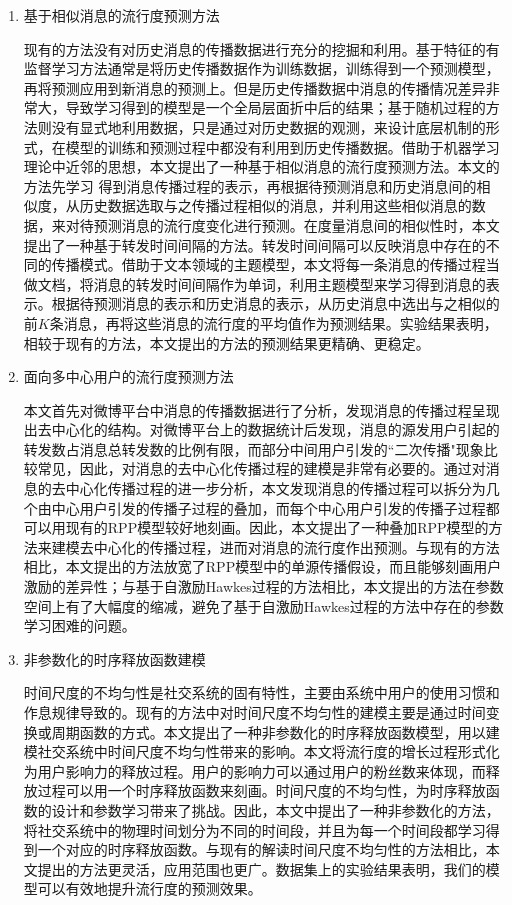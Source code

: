\begin{enumerate}
\item 基于相似消息的流行度预测方法

现有的方法没有对历史消息的传播数据进行充分的挖掘和利用。基于特征的有监督学习方法通常是将历史传播数据作为训练数据，训练得到一个预测模型，再将预测应用到新消息的预测上。但是历史传播数据中消息的传播情况差异非常大，导致学习得到的模型是一个全局层面折中后的结果；基于随机过程的方法则没有显式地利用数据，只是通过对历史数据的观测，来设计底层机制的形式，在模型的训练和预测过程中都没有利用到历史传播数据。借助于机器学习理论中近邻的思想，本文提出了一种基于相似消息的流行度预测方法。本文的方法先学习 得到消息传播过程的表示，再根据待预测消息和历史消息间的相似度，从历史数据选取与之传播过程相似的消息，并利用这些相似消息的数据，来对待预测消息的流行度变化进行预测。在度量消息间的相似性时，本文提出了一种基于转发时间间隔的方法。转发时间间隔可以反映消息中存在的不同的传播模式。借助于文本领域的主题模型，本文将每一条消息的传播过程当做文档，将消息的转发时间间隔作为单词，利用主题模型来学习得到消息的表示。根据待预测消息的表示和历史消息的表示，从历史消息中选出与之相似的前$K$条消息，再将这些消息的流行度的平均值作为预测结果。实验结果表明，相较于现有的方法，本文提出的方法的预测结果更精确、更稳定。
\item 面向多中心用户的流行度预测方法

本文首先对微博平台中消息的传播数据进行了分析，发现消息的传播过程呈现出去中心化的结构。对微博平台上的数据统计后发现，消息的源发用户引起的转发数占消息总转发数的比例有限，而部分中间用户引发的``二次传播"现象比较常见，因此，对消息的去中心化传播过程的建模是非常有必要的。通过对消息的去中心化传播过程的进一步分析，本文发现消息的传播过程可以拆分为几个由中心用户引发的传播子过程的叠加，而每个中心用户引发的传播子过程都可以用现有的RPP模型较好地刻画。因此，本文提出了一种叠加RPP模型的方法来建模去中心化的传播过程，进而对消息的流行度作出预测。与现有的方法相比，本文提出的方法放宽了RPP模型中的单源传播假设，而且能够刻画用户激励的差异性；与基于自激励Hawkes过程的方法相比，本文提出的方法在参数空间上有了大幅度的缩减，避免了基于自激励Hawkes过程的方法中存在的参数学习困难的问题。
\item 非参数化的时序释放函数建模

时间尺度的不均匀性是社交系统的固有特性，主要由系统中用户的使用习惯和作息规律导致的。现有的方法中对时间尺度不均匀性的建模主要是通过时间变换或周期函数的方式。本文提出了一种非参数化的时序释放函数模型，用以建模社交系统中时间尺度不均匀性带来的影响。本文将流行度的增长过程形式化为用户影响力的释放过程。用户的影响力可以通过用户的粉丝数来体现，而释放过程可以用一个时序释放函数来刻画。时间尺度的不均匀性，为时序释放函数的设计和参数学习带来了挑战。因此，本文中提出了一种非参数化的方法，将社交系统中的物理时间划分为不同的时间段，并且为每一个时间段都学习得到一个对应的时序释放函数。与现有的解读时间尺度不均匀性的方法相比，本文提出的方法更灵活，应用范围也更广。数据集上的实验结果表明，我们的模型可以有效地提升流行度的预测效果。
\end{enumerate}
